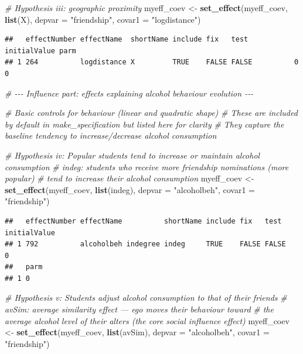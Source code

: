 \documentclass[
]{article}
\newenvironment{Shaded}{\begin{snugshade}}{\end{snugshade}}
\newcommand{\AttributeTok}[1]{\textcolor[rgb]{0.13,0.29,0.53}{#1}}
\newcommand{\CommentTok}[1]{\textcolor[rgb]{0.56,0.35,0.01}{\textit{#1}}}
\newcommand{\FunctionTok}[1]{\textcolor[rgb]{0.13,0.29,0.53}{\textbf{#1}}}
\newcommand{\NormalTok}[1]{#1}
\newcommand{\OtherTok}[1]{\textcolor[rgb]{0.56,0.35,0.01}{#1}}
\newcommand{\StringTok}[1]{\textcolor[rgb]{0.31,0.60,0.02}{#1}}
\begin{document}
\begin{Shaded}
\begin{Highlighting}[]
\CommentTok{\# Hypothesis iii: geographic proximity}
\NormalTok{myeff\_coev }\OtherTok{\textless{}{-}} \FunctionTok{set\_effect}\NormalTok{(myeff\_coev, }\FunctionTok{list}\NormalTok{(X), }\AttributeTok{depvar =} \StringTok{"friendship"}\NormalTok{,}
                         \AttributeTok{covar1 =} \StringTok{"logdistance"}\NormalTok{)}
\end{Highlighting}
\end{Shaded}

\begin{verbatim}
##   effectNumber effectName  shortName include fix   test  initialValue parm
## 1 264          logdistance X         TRUE    FALSE FALSE          0   0
\end{verbatim}

\begin{Shaded}
\begin{Highlighting}[]
\CommentTok{\# {-}{-}{-} Influence part: effects explaining alcohol behaviour evolution {-}{-}{-}}

\CommentTok{\# Basic controls for behaviour (linear and quadratic shape)}
\CommentTok{\# These are included by default in make\_specification but listed here for clarity}
\CommentTok{\# They capture the baseline tendency to increase/decrease alcohol consumption}

\CommentTok{\# Hypothesis iv: Popular students tend to increase or maintain alcohol consumption}
\CommentTok{\# indeg: students who receive more friendship nominations (more popular)}
\CommentTok{\# tend to increase their alcohol consumption}
\NormalTok{myeff\_coev }\OtherTok{\textless{}{-}} \FunctionTok{set\_effect}\NormalTok{(myeff\_coev, }\FunctionTok{list}\NormalTok{(indeg), }\AttributeTok{depvar =} \StringTok{"alcoholbeh"}\NormalTok{,}
                         \AttributeTok{covar1 =} \StringTok{"friendship"}\NormalTok{)}
\end{Highlighting}
\end{Shaded}

\begin{verbatim}
##   effectNumber effectName          shortName include fix   test  initialValue
## 1 792          alcoholbeh indegree indeg     TRUE    FALSE FALSE          0  
##   parm
## 1 0
\end{verbatim}

\begin{Shaded}
\begin{Highlighting}[]
\CommentTok{\# Hypothesis v: Students adjust alcohol consumption to that of their friends}
\CommentTok{\# avSim: average similarity effect — ego moves their behaviour toward}
\CommentTok{\# the average alcohol level of their alters (the core social influence effect)}
\NormalTok{myeff\_coev }\OtherTok{\textless{}{-}} \FunctionTok{set\_effect}\NormalTok{(myeff\_coev, }\FunctionTok{list}\NormalTok{(avSim), }\AttributeTok{depvar =} \StringTok{"alcoholbeh"}\NormalTok{,}
                         \AttributeTok{covar1 =} \StringTok{"friendship"}\NormalTok{)}
\end{Highlighting}
\end{Shaded}
\end{document}
